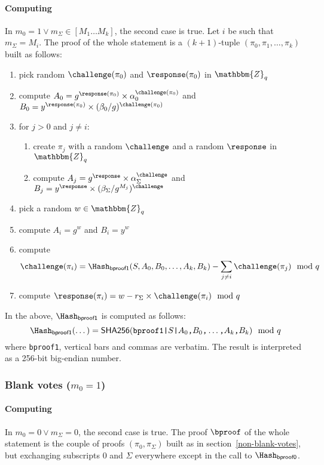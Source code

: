 \documentclass[a4paper]{article}
\newcommand{\Z}{\mathbbm{Z}}
\newcommand{\shatwo}{\textsf{SHA256}}
\begin{document}
\paragraph{Computing \oproof}
In $m_0=1\lor m_\Sigma\in[M_1\dots M_k]$, the second case
is true. Let $i$ be such that $m_\Sigma=M_i$. The proof of the whole
statement is a $(k+1)$-tuple $(\pi_0,\pi_1,\dotsc,\pi_k)$ built as
follows:
\begin{enumerate}
\item pick random $\challenge(\pi_0)$ and $\response(\pi_0)$
  in $\Z_q$
\item compute
  $A_0=g^{\response(\pi_0)}\times\alpha_0^{\challenge(\pi_0)}$
  and
  $B_0=y^{\response(\pi_0)}\times(\beta_0/g)^{\challenge(\pi_0)}$
\item for $j>0$ and $j\neq i$:
  \begin{enumerate}
  \item create $\pi_j$ with a random $\challenge$ and a random
    $\response$ in $\Z_q$
  \item compute
    $A_j={g^\response}\times{\alpha_\Sigma^\challenge}$ and
    $B_j={y^\response}\times{(\beta_\Sigma/g^{M_j})^\challenge}$
  \end{enumerate}
\item pick a random $w\in\Z_q$
\item compute $A_i=g^w$ and $B_i=y^w$
\item compute
  \[\challenge(\pi_i)=\Hash_{\textsf{bproof1}}(S,A_0,B_0,\dots,A_k,B_k)-\sum_{j\neq i}\challenge(\pi_j)\mod q\]
\item compute $\response(\pi_i)=w-r_\Sigma\times\challenge(\pi_i)\mod q$
\end{enumerate}
In the above, $\Hash_{\mathsf{bproof1}}$ is computed as follows:
\[\Hash_{\mathsf{bproof1}}(\dotsc)=
\shatwo(\verb=bproof1|=S\verb=|=A_0\verb=,=B_0\verb=,=\dotsc\verb=,=A_k\verb=,=B_k)\mod q\]
where \verb=bproof1=, vertical bars and commas are verbatim.
The result is interpreted as a 256-bit big-endian number.

\subsubsection{Blank votes ($m_0=1$)}

\paragraph{Computing \bproof}
In $m_0=0\lor m_\Sigma=0$, the second case is true. The proof
$\bproof$ of the whole statement is the couple of proofs
$(\pi_0,\pi_\Sigma)$ built as in section~\ref{non-blank-votes}, but
exchanging subscripts $0$ and $\Sigma$ everywhere except in the call
to $\Hash_{\textsf{bproof0}}$.
\end{document}
